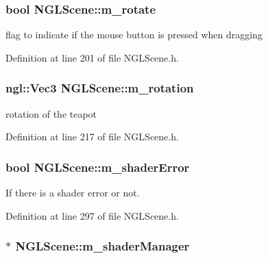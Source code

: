 \subsubsection[{m\-\_\-rotate}]{\setlength{\rightskip}{0pt plus 5cm}bool N\-G\-L\-Scene\-::m\-\_\-rotate\hspace{0.3cm}{\ttfamily [private]}}\label{class_n_g_l_scene_a8e46cb82cac8a56250a272081af233b2}


flag to indicate if the mouse button is pressed when dragging 



Definition at line 201 of file N\-G\-L\-Scene.\-h.

\subsubsection[{m\-\_\-rotation}]{\setlength{\rightskip}{0pt plus 5cm}ngl\-::\-Vec3 N\-G\-L\-Scene\-::m\-\_\-rotation\hspace{0.3cm}{\ttfamily [private]}}\label{class_n_g_l_scene_a20803b11d0eebe2b6ffe248ce5181e94}


rotation of the teapot 



Definition at line 217 of file N\-G\-L\-Scene.\-h.

\subsubsection[{m\-\_\-shader\-Error}]{\setlength{\rightskip}{0pt plus 5cm}bool N\-G\-L\-Scene\-::m\-\_\-shader\-Error\hspace{0.3cm}{\ttfamily [private]}}\label{class_n_g_l_scene_ab06691a468105f0224f7e302bf0c0b21}


If there is a shader error or not. 



Definition at line 297 of file N\-G\-L\-Scene.\-h.

\subsubsection[{m\-\_\-shader\-Manager}]{$\ast$ N\-G\-L\-Scene\-::m\-\_\-shader\-Manager\hspace{0.3cm}{\ttfamily [private]}}\label{class_n_g_l_scene_a32e22d00fcb0209be75d6b62b08c86c1}


